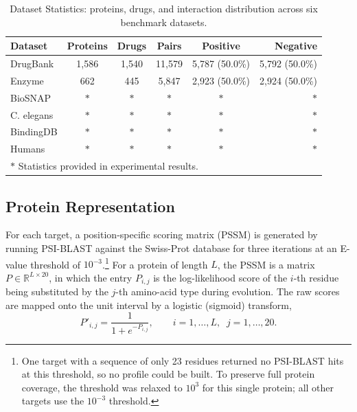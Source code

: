 \documentclass[conference]{IEEEtran}
\begin{document}
\begin{table}[h]
\centering
\caption{Dataset Statistics: proteins, drugs, and interaction distribution across six benchmark datasets.}
\label{tab:dataset_stats}
\renewcommand{\arraystretch}{1.0}
\small
\begin{tabular}{lccccr}
\toprule
\textbf{Dataset} & \textbf{Proteins} & \textbf{Drugs} & \textbf{Pairs} & \textbf{Positive} & \textbf{Negative} \\
\midrule
DrugBank  & 1{,}586 & 1{,}540 & 11{,}579 & 5{,}787 (50.0\%) & 5{,}792 (50.0\%) \\
Enzyme    & 662     & 445     & 5{,}847  & 2{,}923 (50.0\%) & 2{,}924 (50.0\%) \\
BioSNAP   & $\ast$  & $\ast$  & $\ast$   & $\ast$            & $\ast$ \\
C. elegans & $\ast$ & $\ast$  & $\ast$   & $\ast$            & $\ast$ \\
BindingDB & $\ast$  & $\ast$  & $\ast$   & $\ast$            & $\ast$ \\
Humans    & $\ast$  & $\ast$  & $\ast$   & $\ast$            & $\ast$ \\
\bottomrule
\multicolumn{6}{l}{\small $\ast$ Statistics provided in experimental results.}
\end{tabular}
\end{table}

\subsection{Protein Representation}
\label{sec:protein}
For each target, a position-specific scoring matrix (PSSM) is generated by
running PSI-BLAST \cite{ref_psiblast} against the Swiss-Prot database for three
iterations at an E-value threshold of $10^{-3}$.\footnote{One target with a
sequence of only 23 residues returned no PSI-BLAST hits at this threshold, so no
profile could be built. To preserve full protein coverage, the threshold was
relaxed to $10^{3}$ for this single protein; all other targets use the $10^{-3}$
threshold.} For a protein of length $L$, the PSSM is a matrix
$P \in \mathbb{R}^{L \times 20}$, in which the entry $P_{i,j}$ is the
log-likelihood score of the $i$-th residue being substituted by the $j$-th
amino-acid type during evolution. The raw scores are mapped onto the unit
interval by a logistic (sigmoid) transform,
\begin{equation}
P'_{i,j} = \frac{1}{1 + e^{-P_{i,j}}},
\qquad i = 1,\dots,L, \;\; j = 1,\dots,20.
\label{eq:sigmoid}
\end{equation}
\end{document}
